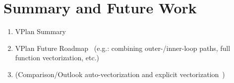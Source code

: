 \documentclass[sigplan,11pt,nonacm]{acmart}
\begin{document}


\section{Summary and Future Work}
\label{sec:summary}
\begin{enumerate}
  \item VPlan Summary~\cite{llvmvplan,llvmvplanupdate}
  \item VPlan Future Roadmap~\cite{llvmvplan,llvmvplanupdate} (e.g.: combining outer-/inner-loop paths, full function vectorization, etc.)
  \item (Comparison/Outlook auto-vectorization and explicit vectorization~\cite{10.1155/2021/3264624, 9802745, DBLP:conf/vldb/BensonER23})
\end{enumerate}




\end{document}

